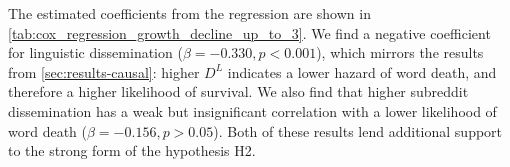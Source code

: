 \begin{table}[t!]
\small
\centering

\caption{Cox regression results for predicting word death with all predictors () averaged over first $k=3$ months.
*** indicates $p<0.001$, otherwise $p>0.05$.}
\label{tab:cox_regression_growth_decline_up_to_3}
\end{table}

The estimated coefficients from the regression are shown in \autoref{tab:cox_regression_growth_decline_up_to_3}.
We find 
a negative coefficient for linguistic dissemination ($\beta=-0.330, p<0.001$), which mirrors the results from \autoref{sec:results-causal}: 
higher $D^{L}$ indicates a lower hazard of word death, and therefore a higher likelihood of survival.
We also find that higher subreddit dissemination has a weak but insignificant correlation with a lower likelihood of word death ($\beta=-0.156, p>0.05$).
Both of these results lend additional support to the strong form of the hypothesis H2.

%


